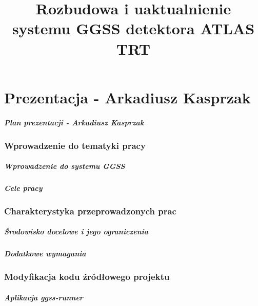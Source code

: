 \documentclass[10pt]{beamer}
\title{Rozbudowa i uaktualnienie systemu GGSS detektora ATLAS TRT}
\author{\normalsize{Arkadiusz Kasprzak \newline \and 
    Jarosław Cierpich \newline \newline \and 
    Opiekun pracy: dr hab. inż. Bartosz Mindur, prof. AGH}}
\date{}
\begin{document}
\titleframe[pl]

\part{Prezentacja - Arkadiusz Kasprzak}

\begin{frame}
\frametitle{Plan prezentacji - Arkadiusz Kasprzak}
\tableofcontents
\end{frame}


\section{Wprowadzenie do tematyki pracy}

\begin{frame}
\frametitle{Wprowadzenie do systemu GGSS}
\end{frame}

\begin{frame}
\frametitle{Cele pracy}
\end{frame}

\section{Charakterystyka przeprowadzonych prac}

\begin{frame}
\frametitle{Środowisko docelowe i jego ograniczenia}
\end{frame}

\begin{frame}
\frametitle{Dodatkowe wymagania}
\end{frame}

\section{Modyfikacja kodu źródłowego projektu}

\begin{frame}
\frametitle{Aplikacja \emph{ggss-runner}}
\end{frame}
\end{document}
